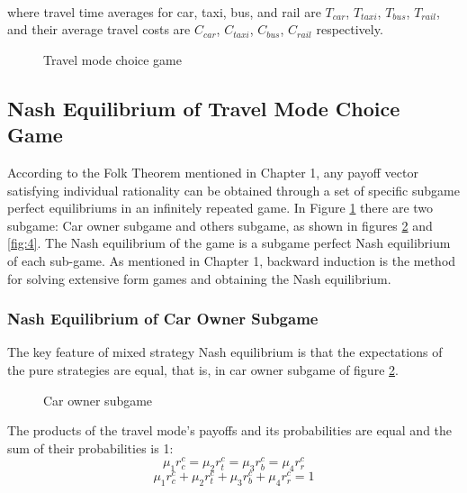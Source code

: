 \paragraph{}where travel time averages for car, taxi, bus, and rail are $T_{car}$, $T_{taxi}$, $T_{bus}$, $T_{rail}$, and their average travel costs are $C_{car}$, $C_{taxi}$, $C_{bus}$, $C_{rail}$ respectively.
\begin{figure}
 
  \centering
  \caption{Travel mode choice game\label{fig:555}}
\end{figure}
\subsection{Nash Equilibrium of Travel Mode Choice Game}
According to the Folk Theorem mentioned in Chapter 1, any payoff vector satisfying individual rationality can be obtained through a set of specific subgame perfect equilibriums in an infinitely repeated game. In Figure \ref{fig:555} there are two subgame: Car owner subgame and others subgame, as shown in figures \ref{fig:3} and \ref{fig:4}. The Nash equilibrium of the game is a subgame perfect Nash equilibrium of each sub-game. As mentioned in Chapter 1, backward induction is the method for solving extensive form games and obtaining the Nash equilibrium.

\subsubsection{Nash Equilibrium of Car Owner Subgame}The key feature of mixed strategy Nash equilibrium is that the expectations of the pure strategies are equal, that is, in car owner subgame of figure \ref{fig:3}. \\

\begin{figure}[!h]
  \centering
  \caption{Car owner subgame\label{fig:3}}
\end{figure}
The products of the travel mode's payoffs and its probabilities are equal and the sum of their probabilities is 1:
\begin{equation}\label{eq:8}
\mu_1 r^c_{c} = \mu_2 r^{c}_{t} = \mu_3 r^c_{b} = \mu_4 r^c_{r}
\end{equation}
\begin{equation}\label{eq:9}
\mu_1 r^c_{c} +  \mu_2 r^{c}_{t} + \mu_3 r^c_{b} + \mu_4 r^c_{r} = 1
\end{equation}

